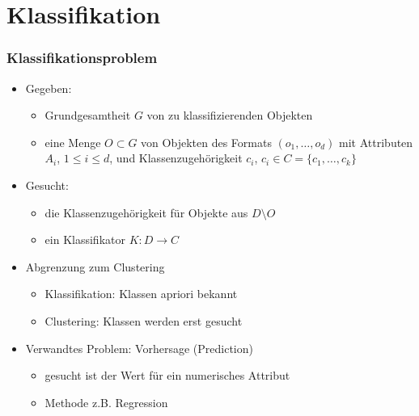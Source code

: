 \section{Klassifikation}




\begin{frame}
\frametitle{Klassifikationsproblem}

\begin{itemize}
\item Gegeben: 
\begin{itemize}
\item Grundgesamtheit $G$ von zu klassifizierenden Objekten
\item eine Menge $O \subset G$ von Objekten des Formats $(o_1, \dots,
  o_d)$ mit Attributen $A_i$, $1 \leq i \leq d$, und
  Klassenzugehörigkeit $c_i$, $c_i \in C = \{c_1, \dots, c_k \}$
\end{itemize}
\item Gesucht:
\begin{itemize}
\item die Klassenzugehörigkeit für Objekte aus $D \setminus O$ 
\item ein Klassifikator $K: D \rightarrow C$
\end{itemize} 
\item Abgrenzung zum Clustering
\begin{itemize}
\item Klassifikation: Klassen apriori bekannt
\item Clustering: Klassen werden erst gesucht
\end{itemize}
\item Verwandtes Problem: Vorhersage (Prediction)
\begin{itemize}
\item gesucht ist der Wert für ein numerisches Attribut 
\item Methode z.B. Regression
\end{itemize}
\end{itemize}

\end{frame}


